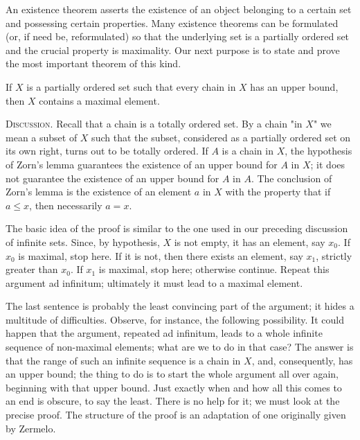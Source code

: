 
An existence theorem asserts the existence of an object belonging to a certain set and possessing certain properties. Many existence theorems can be formulated (or, if need be, reformulated) so that the underlying set is a partially ordered set and the crucial property is maximality. Our next purpose is to state and prove the most important theorem of this kind.

\begin{named} If $X$ is a partially ordered set such that every chain in $X$ has an upper bound, then $X$ contains a maximal element. 
\end{named}

\textsc{Discussion}. Recall that a chain is a totally ordered set. By a chain "in $X$" we mean a subset of $X$ such that the subset, considered as a partially ordered set on its own right, turns out to be totally ordered. If $A$ is a chain in $X$, the hypothesis of Zorn's lemma guarantees the existence of an upper bound for $A$ in $X$; it does not guarantee the existence of an upper bound for $A$ in $A$. The conclusion of Zorn's lemma is the existence of an element $a$ in $X$ with the property that if $a \le x$, then necessarily $a = x$. 

The basic idea of the proof is similar to the one used in our preceding discussion of infinite sets. Since, by hypothesis, $X$ is not empty, it has an element, say $x_{0}$. If $x_{0}$ is maximal, stop here. If it is not, then there exists an element, say $x_{1}$, strictly greater than $x_{0}$. If $x_{1}$ is maximal, stop here; otherwise continue. Repeat this argument ad infinitum; ultimately it must lead to a maximal element. 

The last sentence is probably the least convincing part of the argument; it hides a multitude of difficulties. Observe, for instance, the following possibility. It could happen that the argument, repeated ad infinitum, leads to a whole infinite sequence of non-maximal elements; what are we to do in that case? The answer is that the range of such an infinite sequence is a chain in $X$, and, consequently, has an upper bound; the thing to do is to start the whole argument all over again, beginning with that upper bound. Just exactly when and how all this comes to an end is obscure, to say the least. There is no help for it; we must look at the precise proof. The structure of the proof is an adaptation of one originally given by Zermelo. 

